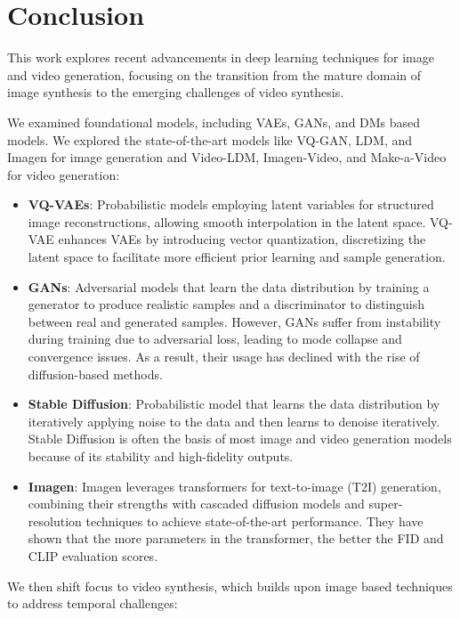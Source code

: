 \section{Conclusion}

This work explores recent advancements in deep learning techniques for image and video generation, focusing on the transition from the mature domain of image synthesis to the emerging challenges of video synthesis.

We examined foundational models, including VAEs, GANs, and DMs based models. We explored the state-of-the-art models like VQ-GAN, LDM, and Imagen for image generation and Video-LDM, Imagen-Video, and Make-a-Video for video generation:

\begin{itemize}
    \item \textbf{VQ-VAEs}: Probabilistic models employing latent variables for structured image reconstructions, allowing smooth interpolation in the latent space. VQ-VAE enhances VAEs by introducing vector quantization, discretizing the latent space to facilitate more efficient prior learning and sample generation.
    
    \item \textbf{GANs}: Adversarial models that learn the data distribution by training a generator to produce realistic samples and a discriminator to distinguish between real and generated samples. However, GANs suffer from instability during training due to adversarial loss, leading to mode collapse and convergence issues. As a result, their usage has declined with the rise of diffusion-based methods.
    
    \item \textbf{Stable Diffusion}: Probabilistic model that learns the data distribution by iteratively applying noise to the data and then learns to denoise iteratively. Stable Diffusion is often the basis of most image and video generation models because of its stability and high-fidelity outputs.
    
    \item \textbf{Imagen}: Imagen leverages transformers for text-to-image (T2I) generation, combining their strengths with cascaded diffusion models and super-resolution techniques to achieve state-of-the-art performance. They have shown that the more parameters in the transformer, the better the FID and CLIP evaluation scores.
\end{itemize}

We then shift focus to video synthesis, which builds upon image based techniques to address temporal challenges:

